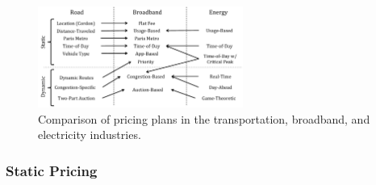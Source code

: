 \begin{figure}
\centering
\includegraphics[width = 0.6\textwidth]{Figures/Relationships.pdf}
\caption{Comparison of pricing plans in the transportation, broadband, and electricity industries.}
\label{fig:compare}
\end{figure}


\subsubsection{Static Pricing}

